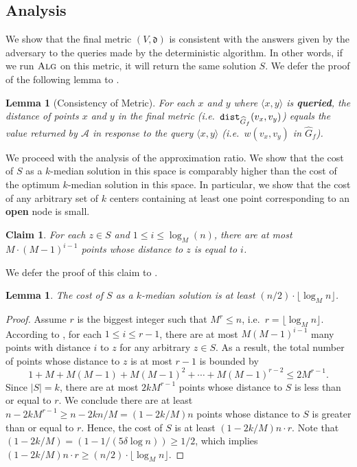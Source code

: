 \documentclass[11pt]{article}
\newcommand{\1}{\mathmybb{1}}
\newtheorem{lemma}[theorem]{Lemma}
\newtheorem{claim}[theorem]{Claim}
\newcommand{\A}{\textsc{Alg}}
\newcommand{\dist}{\textnormal{\texttt{dist}}}
\newcommand{\adv}[0]{\mathcal{A}}
\begin{document}
\subsection{Analysis}

We show that the final metric $(V, \mathfrak d)$ is consistent with the answers given by the adversary to the queries made by the deterministic algorithm.
In other words, if we run $\A$ on this metric, it will return the same solution $S$. 
We defer the proof of the following lemma to .

\begin{lemma}[Consistency of Metric]\label{lem:queried-weights-equal-shortest-paths}
    For each $x$ and $y$ where $\langle x,y \rangle$ is \textbf{queried}, the distance of points $x$ and $y$ in the final metric (i.e.~$\dist_{\widehat G_f}(v_x,v_y)$) equals the value returned by $\adv$ in response to the query $\langle x,y \rangle$ (i.e.~$w(v_x, v_y)$ in $\widehat G_f$).
\end{lemma}

We proceed with the analysis of the approximation ratio.
We show that the cost of $S$ as a $k$-median solution in this space is comparably higher than the cost of the optimum $k$-median solution in this space. In particular, we show that the cost of any arbitrary set of $k$ centers containing at least one point corresponding to an \textbf{open} node is small.

\begin{claim}\label{lem:number-of-neighbours-of-distance-one}
    For each $z \in S$ and $1 \leq i \leq \log_M(n)$, there are at most $M\cdot (M-1)^{i-1}$ points whose distance to $z$ is equal to $i$.
\end{claim}


We defer the proof of this claim to .



\begin{lemma}\label{lem:lower-bound-on-approx-of-Z}
    The cost of $S$ as a $k$-median solution is at least $(n/2) \cdot  \lfloor \log_M n \rfloor $.
\end{lemma}

\begin{proof}
    Assume $r$ is the biggest integer such that $M^r \leq n$, i.e.~$r = \lfloor \log_M n \rfloor$.
    According to , for each $1 \leq i \leq r-1$, there are at most $M(M-1)^{i-1}$ many points with distance $i$ to $z$ for any arbitrary $z \in S$.
    As a result, the total number of points whose distance to $z$ is at most $r-1$ is bounded by
    $$ 1 + M + M(M-1) + M(M-1)^2 + \cdots + M(M-1)^{r-2} \leq 2M^{r-1}. $$
    Since $|S| = k$, there are at most $2kM^{r-1}$ points whose distance to $S$ is less than or equal to $r$.
    We conclude there are at least $n - 2kM^{r-1} \geq n - 2kn/M = (1 - 2k/M) n $  points whose distance to $S$ is greater than or equal to $r$.
    Hence, the cost of $S$ is at least
    $ (1 - 2k/M)n \cdot r $.
    Note that
    $(1 - 2k/M) = (1 - 1/(5\delta\log n)) \geq 1/2$, which implies
    $ (1 - 2k/M)n \cdot r \geq  (n/2)\cdot \lfloor \log_M n \rfloor $.
\end{proof}
\end{document}
